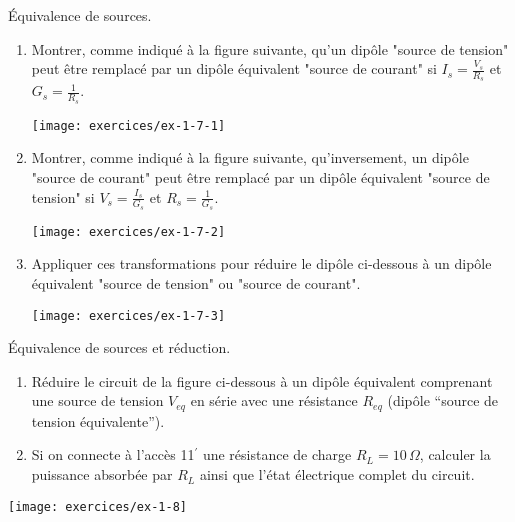 \begin{exercise}{Équivalence de sources.}
\label{ex:1-7}
\begin{enumerate}
\item Montrer, comme indiqué à la figure suivante, qu'un dipôle "source de tension" peut être
remplacé par un dipôle équivalent "source de courant" si $I_s = \frac{V_s}{R_s}$ et $G_s = \frac{1}{R_s}$.
\begin{center}
	\texttt{[image: exercices/ex-1-7-1]}
\end{center}
\item Montrer, comme indiqué à la figure suivante,  qu'inversement, un
dipôle "source de courant" peut être remplacé par un dipôle
équivalent "source de tension" si $V_s = \frac{I_s}{G_s}$ et $R_s = \frac{1}{G_s}$.
\begin{center}
	\texttt{[image: exercices/ex-1-7-2]}
\end{center}
\item Appliquer ces transformations pour réduire le dipôle ci-dessous à un
dipôle équivalent "source de tension" ou "source de courant".
\begin{center}
	\texttt{[image: exercices/ex-1-7-3]}
\end{center}
\end{enumerate}
\end{exercise}

\begin{exercise}{Équivalence de sources et réduction.}
\label{ex:1-8}
\begin{enumerate}
	\item Réduire le circuit de la figure ci-dessous à un dipôle
	équivalent comprenant une source de tension $V_{eq}$ en série avec une résistance $R_{eq}$
	(dipôle ``source de tension équivalente'').
	\item Si on connecte à l'accès  11$^{'}$ une résistance de charge  $R_L=10\,
	\Omega$, calculer la puissance absorbée par $R_L$ ainsi que l'état
	électrique complet du circuit.
\end{enumerate}

\begin{center}
	\texttt{[image: exercices/ex-1-8]}
\end{center}


\end{exercise}

